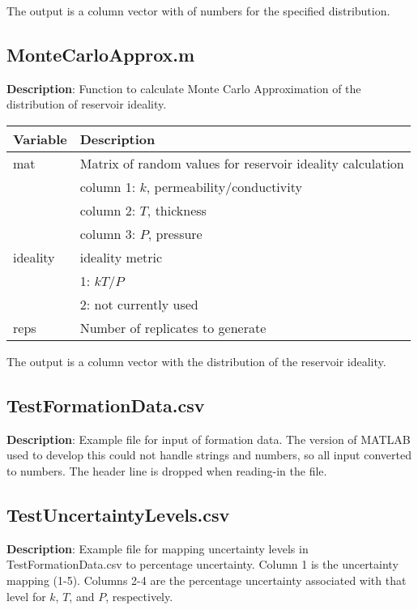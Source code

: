 \documentclass[12pt,a4paper]{article}
\begin{document}
The output is a column vector with of numbers for the specified distribution.

\subsection{\textsf{MonteCarloApprox.m}}

\textbf{Description}: Function to calculate Monte Carlo Approximation of the distribution of reservoir ideality.

\begin{table}[H]
\begin{tabular} {p{2cm} p{11cm}}
\hline
\textbf{Variable} & \textbf{Description}\\
\hline
\textsf{mat} 			 & Matrix of random values for reservoir ideality calculation\\
 & column 1: $k$, permeability/conductivity\\
 & column 2: $T$, thickness\\
 & column 3: $P$, pressure\\
\textsf{ideality} & ideality metric\\
 & 1: $kT/P$\\
 & 2: not currently used\\
\textsf{reps} & Number of replicates to generate\\
\hline
\end{tabular} 
\end{table}

The output is a column vector with the distribution of the reservoir ideality.

\subsection{\textsf{TestFormationData.csv}}

\textbf{Description}: Example file for input of formation data. The version of MATLAB used to develop this could not handle strings and numbers, so all input converted to numbers. The header line is dropped when reading-in the file.

\subsection{\textsf{TestUncertaintyLevels.csv}}

\textbf{Description}: Example file for mapping uncertainty levels in \textsf{TestFormationData.csv} to percentage uncertainty. Column 1 is the uncertainty mapping (1-5). Columns 2-4 are the percentage uncertainty associated with that level for $k$, $T$, and $P$, respectively.
\end{document}

